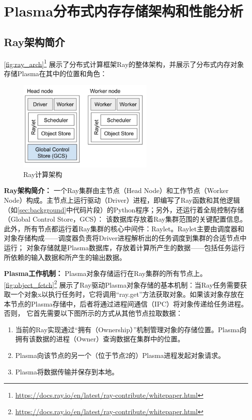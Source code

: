 \chapter{Plasma分布式内存存储架构和性能分析}

\section{Ray架构简介}

\autoref{fig:ray_arch}\footnote{\url{https://docs.ray.io/en/latest/ray-contribute/whitepaper.html}}
展示了分布式计算框架Ray的整体架构，并展示了分布式内存对象存储Plasma在其中的位置和角色：

\begin{figure}[h] 
    \centering
    \includegraphics[width=0.6\textwidth]{image/chap02/ray_arch.png}
    \caption{Ray计算架构}
    \label{fig:ray_arch}
\end{figure}

\textbf{Ray架构简介：}
一个Ray集群由主节点（Head Node）和工作节点（Worker Node）构成。主节点上运行驱动（Driver）进程，即编写了Ray函数和其他逻辑（如\autoref{sec:background}中代码片段）的Python程序；另外，还运行着全局控制存储（Global Control Store，GCS）：
该数据库存放着Ray集群范围的关键配置信息。此外，所有节点都运行着Ray集群的核心中间件：Raylet。Raylet主要由调度器和对象存储构成——调度器负责将Driver进程解析出的任务调度到集群的合适节点中运行；
对象存储就是Plasma数据库，存放着计算所产生的数据——包括任务运行所依赖的输入数据和所产生的输出数据。

\textbf{Plasma工作机制：}
Plasma对象存储运行在Ray集群的所有节点上。\autoref{fig:object_fetch}\footnote{\url{https://docs.ray.io/en/latest/ray-contribute/whitepaper.html}}
展示了Ray驱动Plasma对象存储的基本机制：当Ray任务需要获取一个对象x以执行任务时，它将调用“ray.get”方法获取对象。如果该对象存放在本节点的Plasma存储中，后者将通过进程间通信（IPC）将对象传递给任务进程。否则，
它首先需要以下图所示的方式从其他节点拉取数据：

\begin{enumerate}
    \item 当前的Ray实现通过“拥有（Ownership\cite{wang2021ownership}）”机制管理对象的存储位置。Plasma向拥有该数据的进程（Owner）查询数据在集群中的位置。
    \item Plasma向该节点的另一个（位于节点2的）Plasma进程发起对象请求。
    \item Plasma将数据传输并保存到本地。
\end{enumerate}


